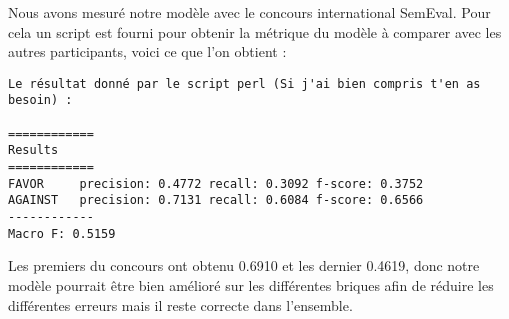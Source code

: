 \par Nous avons mesuré notre modèle avec le concours international SemEval. Pour cela un script est fourni pour obtenir la métrique du modèle à comparer avec les autres participants, voici ce que l'on obtient : \\

\begin{verbatim}
Le résultat donné par le script perl (Si j'ai bien compris t'en as besoin) :

============
Results
============
FAVOR     precision: 0.4772 recall: 0.3092 f-score: 0.3752
AGAINST   precision: 0.7131 recall: 0.6084 f-score: 0.6566
------------
Macro F: 0.5159
\end{verbatim}

\par Les premiers du concours ont obtenu 0.6910 et les dernier 0.4619, donc notre modèle pourrait être bien amélioré sur les différentes briques afin de réduire les différentes erreurs mais il reste correcte dans l'ensemble. 